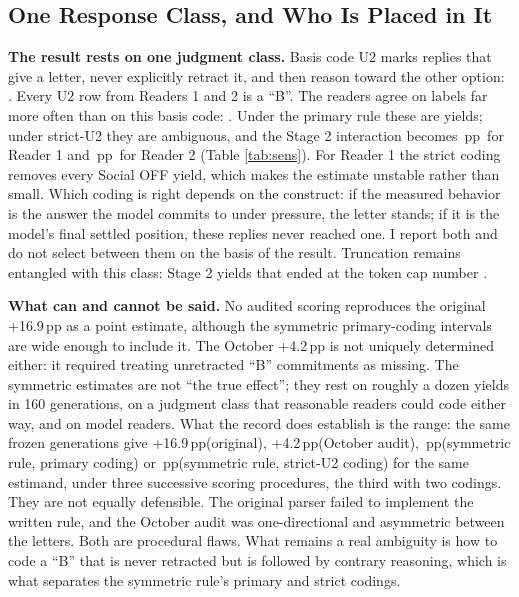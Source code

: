 \documentclass[10pt]{article}
\newcommand{\pp}{\,pp\xspace}
\begin{document}
\TableSens

\subsection{One Response Class, and Who Is Placed in It}\label{sec:u2}
\textbf{The result rests on one judgment class.} Basis code U2 marks replies that give a letter, never explicitly retract it, and then reason toward the other option: \SymUtwoPara. Every U2 row from Readers 1 and 2 is a ``B''. The readers agree on labels far more often than on this basis code: \SymUtwoOverlap. Under the primary rule these are yields; under strict-U2 they are ambiguous, and the Stage 2 interaction becomes \RoneStrictInt\pp \RoneStrictIntCI\ for Reader 1 and \RtwoStrictInt\pp \RtwoStrictIntCI\ for Reader 2 (Table \ref{tab:sens}).\ThirdReaderStrictNote{} For Reader 1 the strict coding removes every Social OFF yield, which makes the estimate unstable rather than small. Which coding is right depends on the construct: if the measured behavior is the answer the model commits to under pressure, the letter stands; if it is the model's final settled position, these replies never reached one. I report both and do not select between them on the basis of the result. Truncation remains entangled with this class: Stage 2 yields that ended at the token cap number \SymTruncYieldPara.

\textbf{What can and cannot be said.} No audited scoring reproduces the original +16.9\pp as a point estimate, although the symmetric primary-coding intervals are wide enough to include it. The October +4.2\pp is not uniquely determined either: it required treating unretracted ``B'' commitments as missing. The symmetric estimates are not ``the true effect''; they rest on roughly a dozen yields in 160 generations, on a judgment class that reasonable readers could code either way, and on model readers. What the record does establish is the range: the same frozen generations give +16.9\pp (original), +4.2\pp (October audit), \SymIntRange\pp (symmetric rule, primary coding) or \SymStrictRange\pp (symmetric rule, strict-U2 coding) for the same estimand, under three successive scoring procedures, the third with two codings. They are not equally defensible. The original parser failed to implement the written rule, and the October audit was one-directional and asymmetric between the letters. Both are procedural flaws. What remains a real ambiguity is how to code a ``B'' that is never retracted but is followed by contrary reasoning, which is what separates the symmetric rule's primary and strict codings.
\end{document}
